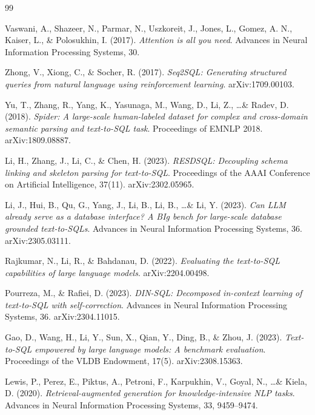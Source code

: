 \renewcommand{\bibname}{References}
\begin{thebibliography}{99}

Vaswani, A., Shazeer, N., Parmar, N., Uszkoreit, J., Jones, L., Gomez, A. N., Kaiser, L., \& Polosukhin, I. (2017).
\textit{Attention is all you need}.
Advances in Neural Information Processing Systems, 30.

Zhong, V., Xiong, C., \& Socher, R. (2017).
\textit{Seq2SQL: Generating structured queries from natural language using reinforcement learning}.
arXiv:1709.00103.

Yu, T., Zhang, R., Yang, K., Yasunaga, M., Wang, D., Li, Z., \ldots \& Radev, D. (2018).
\textit{Spider: A large-scale human-labeled dataset for complex and cross-domain semantic parsing and text-to-SQL task}.
Proceedings of EMNLP 2018. arXiv:1809.08887.

Li, H., Zhang, J., Li, C., \& Chen, H. (2023).
\textit{RESDSQL: Decoupling schema linking and skeleton parsing for text-to-SQL}.
Proceedings of the AAAI Conference on Artificial Intelligence, 37(11). arXiv:2302.05965.

Li, J., Hui, B., Qu, G., Yang, J., Li, B., Li, B., \ldots \& Li, Y. (2023).
\textit{Can LLM already serve as a database interface? A BIg bench for large-scale database grounded text-to-SQLs}.
Advances in Neural Information Processing Systems, 36. arXiv:2305.03111.

Rajkumar, N., Li, R., \& Bahdanau, D. (2022).
\textit{Evaluating the text-to-SQL capabilities of large language models}.
arXiv:2204.00498.

Pourreza, M., \& Rafiei, D. (2023).
\textit{DIN-SQL: Decomposed in-context learning of text-to-SQL with self-correction}.
Advances in Neural Information Processing Systems, 36. arXiv:2304.11015.

Gao, D., Wang, H., Li, Y., Sun, X., Qian, Y., Ding, B., \& Zhou, J. (2023).
\textit{Text-to-SQL empowered by large language models: A benchmark evaluation}.
Proceedings of the VLDB Endowment, 17(5). arXiv:2308.15363.

Lewis, P., Perez, E., Piktus, A., Petroni, F., Karpukhin, V., Goyal, N., \ldots \& Kiela, D. (2020).
\textit{Retrieval-augmented generation for knowledge-intensive NLP tasks}.
Advances in Neural Information Processing Systems, 33, 9459--9474.


\end{thebibliography}
